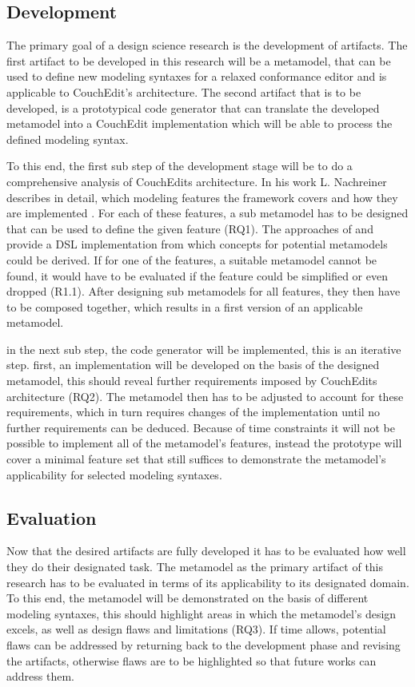 \subsection{Development}
The primary goal of a design science research is the development of artifacts.
The first artifact to be developed in this research will be a metamodel, that can be used to define new modeling syntaxes for a relaxed conformance editor and is applicable to CouchEdit's architecture. The second artifact that is to be developed, is a prototypical code generator that can translate the developed metamodel into a CouchEdit implementation which will be able to process the defined modeling syntax.

To this end, the first sub step of the development stage will be to do a comprehensive analysis of CouchEdits architecture. In his work L. Nachreiner describes in detail, which modeling features the framework covers and how they are implemented \cite{nachreiner_couchedit_2020}. For each of these features, a sub metamodel has to be designed that can be used to define the given feature (RQ1). The approaches of \cite{minas_specifying_2001} and \cite{fondement_making_2005} provide a DSL implementation from which concepts for potential metamodels could be derived. If for one of the features, a suitable metamodel cannot be found, it would have to be evaluated if the feature could be simplified or even dropped (R1.1). After designing sub metamodels for all features, they then have to be composed together, which results in a first version of an applicable metamodel. 

in the next sub step, the code generator will be implemented, this is an iterative step. first, an implementation will be developed on the basis of the designed metamodel, this should reveal further requirements imposed by CouchEdits architecture (RQ2). The metamodel then has to be adjusted to account for these requirements, which in turn requires changes of the implementation until no further requirements can be deduced. Because of time constraints it will not be possible to implement all of the metamodel's features, instead the prototype will cover a minimal feature set that still suffices to demonstrate the metamodel's applicability for selected modeling syntaxes.

\subsection{Evaluation}
Now that the desired artifacts are fully developed it has to be evaluated how well they do their designated task. The metamodel as the primary artifact of this research has to be evaluated in terms of its applicability to its designated domain. To this end, the metamodel will be demonstrated on the basis of different modeling syntaxes, this should highlight areas in which the metamodel's design excels, as well as design flaws and limitations (RQ3). If time allows, potential flaws can be addressed by returning back to the development phase and revising the artifacts, otherwise flaws are to be highlighted so that future works can address them.

